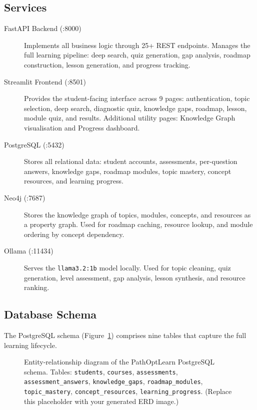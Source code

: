 \documentclass[12pt,a4paper]{article}
\begin{document}
\subsection{Services}

\begin{description}
  \item[FastAPI Backend (:8000)] Implements all business logic through 25+
    REST endpoints. Manages the full learning pipeline: deep search,
    quiz generation, gap analysis, roadmap construction, lesson generation,
    and progress tracking.

  \item[Streamlit Frontend (:8501)] Provides the student-facing interface
    across 9 pages: authentication, topic selection, deep search, diagnostic
    quiz, knowledge gaps, roadmap, lesson, module quiz, and results.
    Additional utility pages: Knowledge Graph visualisation and Progress
    dashboard.

  \item[PostgreSQL (:5432)] Stores all relational data: student accounts,
    assessments, per-question answers, knowledge gaps, roadmap modules,
    topic mastery, concept resources, and learning progress.

  \item[Neo4j (:7687)] Stores the knowledge graph of topics, modules,
    concepts, and resources as a property graph. Used for roadmap caching,
    resource lookup, and module ordering by concept dependency.

  \item[Ollama (:11434)] Serves the \texttt{llama3.2:1b} model locally.
    Used for topic cleaning, quiz generation, level assessment, gap analysis,
    lesson synthesis, and resource ranking.
\end{description}

\subsection{Database Schema}

The PostgreSQL schema (Figure~\ref{fig:schema}) comprises nine tables that
capture the full learning lifecycle.

\begin{figure}[H]
  \centering
  \caption{Entity-relationship diagram of the PathOptLearn PostgreSQL schema.
  Tables: \texttt{students}, \texttt{courses}, \texttt{assessments},
  \texttt{assessment\_answers}, \texttt{knowledge\_gaps},
  \texttt{roadmap\_modules}, \texttt{topic\_mastery},
  \texttt{concept\_resources}, \texttt{learning\_progress}.
  (Replace this placeholder with your generated ERD image.)}
  \label{fig:schema}
\end{figure}
\end{document}
